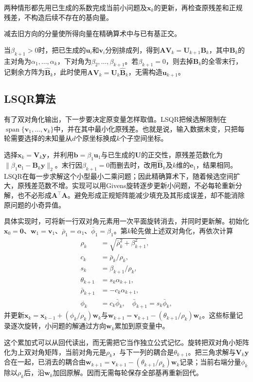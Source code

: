 两种情形都先用已生成的系数完成当前小问题及$\bm x_k$的更新，再检查原残差和正规残差，不构造后续不存在的基向量。

减去旧方向的分量使所得向量在精确算术中与已有基正交。

当$\beta_{k+1}>0$时，把已生成的$\bm u_i$和$\bm v_i$分别排成列，得到$\bm A\bm V_k=\bm U_{k+1}\bm B_k$，其中$\bm B_k$的主对角为$\alpha_1,\ldots,\alpha_k$，下对角为$\beta_2,\ldots,\beta_{k+1}$。若$\beta_{k+1}=0$，则去掉$\bm B_k$的全零末行，记剩余方阵为$\widehat{\bm B}_k$，此时使用$\bm A\bm V_k=\bm U_k\widehat{\bm B}_k$，无需构造$\bm u_{k+1}$。

\subsection{LSQR算法}

有了双对角化输出，下一步要决定原变量怎样取值。LSQR把候选解限制在$\operatorname{span}\{\bm v_1,\ldots,\bm v_k\}$中，并在其中最小化原残差。也就是说，输入数据未变，只把每轮需要选择的未知量从$d$个原坐标换成$k$个子空间坐标。

选择$\bm x_k=\bm V_k\bm y$，并利用$\bm b=\beta_1\bm u_1$与已生成的$\bm U$的正交性，原残差范数化为$\lVert\beta_1\bm e_1-\bm B_k\bm y\rVert_2$。末行因$\beta_{k+1}=0$而删去时，改用$\widehat{\bm B}_k$及$k$维的$\bm e_1$，结果相同。LSQR在每一步求解这个小型最小二乘问题；因此精确算术下，随着候选空间扩大，原残差范数不增。实现可以用Givens旋转逐步更新小问题，不必每轮重新分解，也不必形成$\bm A^\top\bm A$。避免形成正规矩阵能减少填充及其形成误差，却不能消除原问题的小奇异值。

具体实现时，可将新一行双对角元素用一次平面旋转消去，并同时更新解。初始化$\bm x_0=\bm0$、$\bm w_1=\bm v_1$、$\bar\rho_1=\alpha_1$、$\bar\phi_1=\beta_1$。第$k$轮先做上述双对角化，再依次计算
\begin{align*}
 \rho_k&=\sqrt{\bar\rho_k^2+\beta_{k+1}^2},\\
 c_k&=\bar\rho_k/\rho_k,\\
 s_k&=\beta_{k+1}/\rho_k,\\
 \theta_{k+1}&=s_k\alpha_{k+1},\\
 \bar\rho_{k+1}&=-c_k\alpha_{k+1},\\
 \phi_k&=c_k\bar\phi_k,\quad \bar\phi_{k+1}=s_k\bar\phi_k,
\end{align*}
并更新$\bm x_k=\bm x_{k-1}+(\phi_k/\rho_k)\bm w_k$与$\bm w_{k+1}=\bm v_{k+1}-(\theta_{k+1}/\rho_k)\bm w_k$。这些标量记录逐次旋转，小问题的解通过方向$\bm w_k$累加到原变量中。

这个累加式可以从回代读出，而无需把它当作独立公式记忆。旋转把双对角小矩阵化为上双对角矩阵，当前对角元是$\rho_k$，与下一列的耦合是$\theta_{k+1}$。把三角求解与$\bm V_k\bm y$合在一起，已消去的耦合由$\bm w_{k+1}=\bm v_{k+1}-(\theta_{k+1}/\rho_k)\bm w_k$记录；当前右端分量$\phi_k$除以$\rho_k$后，沿$\bm w_k$加回原解。因而无需每轮保存全部基再重新回代。

